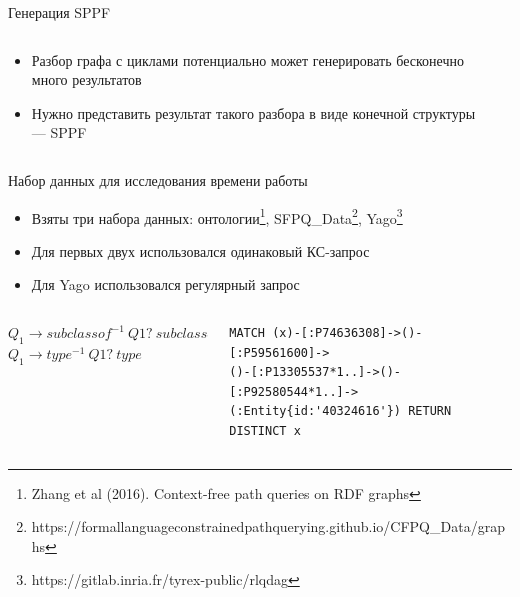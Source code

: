 \documentclass[aspectratio=169]{beamer}
\begin{document}
\begin{frame}{Генерация SPPF}
  \begin{columns}[c]
    \begin{column}{0.55\textwidth}
      \begin{itemize}
        \item Разбор графа с циклами потенциально может генерировать бесконечно много результатов
        \item Нужно представить результат такого разбора в виде конечной структуры --- SPPF
      \end{itemize}

    \end{column}
    \begin{column}{0.55\textwidth}
      \center{}
    \end{column}
  \end{columns}
\end{frame}

\begin{frame}[fragile]{Набор данных для исследования времени работы}
  \begin{itemize}
    \item Взяты три набора данных: онтологии\footnote[1]{Zhang et al (2016). Context-free path queries on RDF graphs}, SFPQ\_Data\footnote[2]{https://formallanguageconstrainedpathquerying.github.io/CFPQ\_Data/graphs}, Yago\footnote[3]{https://gitlab.inria.fr/tyrex-public/rlqdag}
    \item Для первых двух использовался одинаковый КС-запрос
    \item Для Yago использовался регулярный запрос
  \end{itemize}
  \begin{columns}[t]
    \begin{column}{0.46\textwidth}
      $Q_1 \to subclassof^{-1}\ Q1?\ subclassof$\\
      $Q_1 \to type^{-1}\ Q1?\ type$\\
    \end{column}

    \begin{column}{0.6\textwidth}
      \begin{verbatim}
MATCH (x)-[:P74636308]->()-[:P59561600]->
()-[:P13305537*1..]->()-[:P92580544*1..]->
(:Entity{id:'40324616'}) RETURN DISTINCT x
\end{verbatim}
    \end{column}
  \end{columns}

\end{frame}
\end{document}

